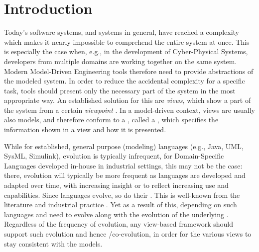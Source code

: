 \section{Introduction}
\label{sec:Introduction}

Today's software systems, and systems in general, have reached a complexity which
makes it nearly impossible to comprehend the entire system at once.
This is especially the case when, e.g., in the development of Cyber-Physical Systems,
developers from multiple domains are working together on the same system.
Modern Model-Driven Engineering tools therefore need to provide abstractions of the modeled system.
In order to reduce the accidental complexity for a specific task, tools should present only the necessary part of the system in the most appropriate way.
An established solution for this are \emph{views}, which show a part of the system from a certain \emph{viewpoint} \cite{atkinson_orthographic_2010}.
In a model-driven context, views are usually also models, and therefore conform to a \metamodel,
called a \emph{\viewtype} \cite{goldschmidt_towards_2012}, which specifies 
the information shown in a view and how it is presented.

While for established, general purpose (modeling) languages (e.g., Java, UML, SysML, Simulink), evolution is typically infrequent, for Domain-Specific Languages developed in-house in industrial settings, this may not be the case: there, evolution will typically be more frequent as languages are developed and adapted over time, with increasing insight or to reflect increasing use and capabilities.
Since languages evolve, so do their \metamodels. This is well-known from the literature and industrial practice \cite{durisic_evolution_2014}. Yet as a result of this, \viewtypes depending on such languages and \metamodels need to evolve along with the evolution of the underlying \metamodels. Regardless of the frequency of \metamodel evolution, any view-based framework should support such evolution and hence \metamodel/\viewtype co-evolution, in order for the various views to stay consistent with the models. 

